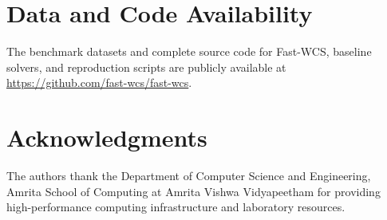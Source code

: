 \documentclass[a4paper,fleqn]{cas-dc}
\theoremstyle{thmstyleone}
\theoremstyle{thmstyletwo}
\theoremstyle{thmstylethree}
\begin{document}
\section*{Data and Code Availability}
The benchmark datasets and complete source code for Fast-WCS, baseline solvers, and reproduction scripts are publicly available at \url{https://github.com/fast-wcs/fast-wcs}.

\section*{Acknowledgments}
The authors thank the Department of Computer Science and Engineering, Amrita School of Computing at Amrita Vishwa Vidyapeetham for providing high-performance computing infrastructure and laboratory resources.

\end{document}
